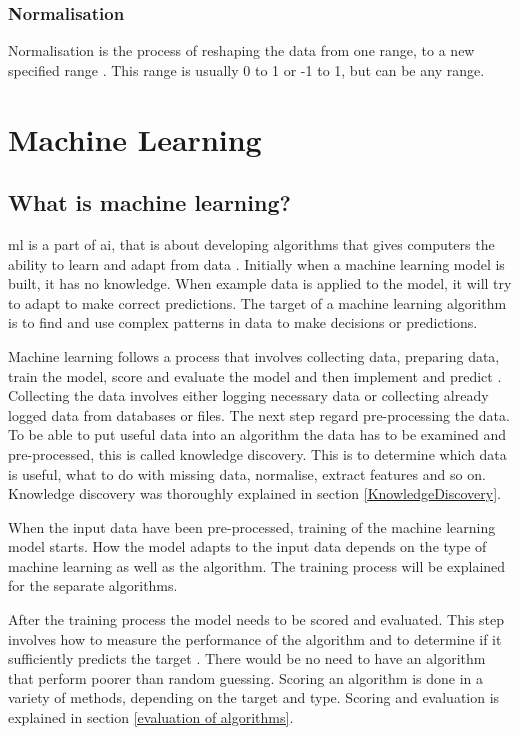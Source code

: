 \documentclass[english, a4paper]{report}
\begin{document}
{{{            \subsubsection{Normalisation}
            {
                Normalisation is the process of reshaping the data from one range, to a new specified range \cite{scikit-learn-pre-processing}. This range is usually 0 to 1 or -1 to 1, but can be any range. 
            }
        }
    }
    
    \section{Machine Learning}\label{machine learning}
    {
        \subsection{What is machine learning?}\label{what is ml}
        {
             \Gls{ml} is a part of \gls{ai}, that is about developing algorithms that gives computers the ability to learn and adapt from data \cite{artificialIntelligence}. Initially when a machine learning model is built, it has no knowledge. When example data is applied to the model, it will try to adapt to make correct predictions. The target of a machine learning algorithm is to find and use complex patterns in data to make decisions or predictions. 
             \par 
             Machine learning follows a process that involves collecting data, preparing data, train the model, score and evaluate the model and then implement and predict \cite{mlKelleher}. Collecting the data involves either logging necessary data or collecting already logged data from databases or files. The next step regard pre-processing the data. To be able to put useful data into an algorithm the data has to be examined and pre-processed, this is called knowledge discovery. This is to determine which data is useful, what to do with missing data, normalise, extract features and so on. Knowledge discovery was thoroughly explained in section \ref{KnowledgeDiscovery}.
             \par
             When the input data have been pre-processed, training of the machine learning model starts. How the model adapts to the input data depends on the type of machine learning as well as the algorithm. The training process will be explained for the separate algorithms. 
             \par 
             After the training process the model needs to be scored and evaluated. This step involves how to measure the performance of the algorithm and to determine if it sufficiently predicts the target \cite{mlKelleher}. There would be no need to have an algorithm that perform poorer than random guessing. Scoring an algorithm is done in a variety of methods, depending on the target and type. Scoring and evaluation is explained in section \ref{evaluation of algorithms}.
}}}
\end{document}
